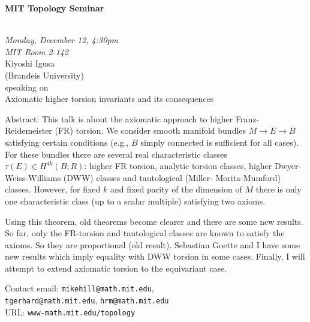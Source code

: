\documentclass{slides}
\begin{document}
\begin{center}

{\fontsize {54pt}{40pt}\selectfont

\textrm{
{\textbf{MIT Topology Seminar}}}
}\\
\vspace{.7cm}
{\large\textrm{\emph{Monday, December 12, 4:30pm\\MIT Room 2-142}}}\\
\vspace{.7cm}
\textrm{{\LARGE Kiyoshi Igusa  \\[.5cm]\large(Brandeis University)}}\\
\vspace{1cm} %
\textrm{speaking on}\\ %
\vspace{5mm}
\textrm{{\LARGE Axiomatic higher torsion invariants and its consequences}}\\
\end{center}
\vspace{1cm}
{\tiny Abstract: This talk is about the axiomatic approach to higher Franz-
Reidemeister (FR) torsion.
We consider smooth manifold bundles $M\to E\to B$ satisfying certain
conditions (e.g., $B$ simply connected is sufficient for all cases).
For these bundles there are several real characteristic classes $\tau
(E)\in H^{4k}(B;R)$: higher FR torsion, analytic torsion classes,
higher Dwyer-Weiss-Williams (DWW) classes and tautological (Miller-
Morita-Mumford) classes.
However, for fixed $k$ and fixed parity of the dimension of $M$ there
is only one characteristic class (up to a scalar multiple) satisfying
two axioms.

Using this theorem, old theorems become clearer and there are some
new results.
So far, only the FR-torsion and tautological classes are known to
satisfy the axioms. So they are proportional (old result). Sebastian
Goette and I have some new results which imply equality with DWW
torsion in some cases. Finally, I will attempt to extend axiomatic
torsion to the equivariant case.

\textrm{Contact email: } \texttt{mikehill@math.mit.edu},\\
 \texttt{tgerhard@math.mit.edu},
\texttt{hrm@math.mit.edu}\\
\textrm{URL: } \texttt{www-math.mit.edu/topology}
}
\end{document}
